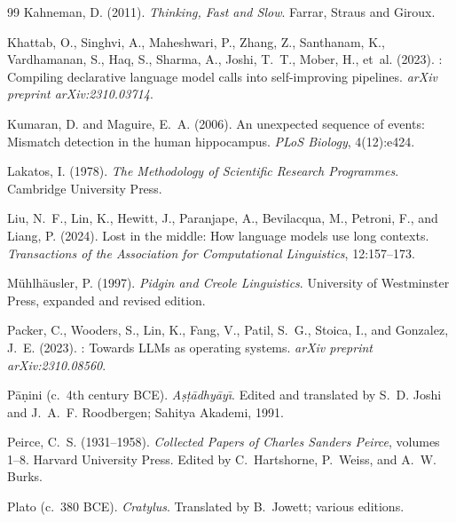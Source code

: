 \documentclass[11pt,a4paper]{article}
\begin{document}
\begin{thebibliography}{99}
Kahneman, D. (2011).
\newblock \emph{Thinking, Fast and Slow}.
\newblock Farrar, Straus and Giroux.

Khattab, O., Singhvi, A., Maheshwari, P., Zhang, Z., Santhanam, K., Vardhamanan, S., Haq, S., Sharma, A., Joshi, T.~T., Mober, H., et~al. (2023).
: Compiling declarative language model calls into self-improving pipelines.
\newblock \emph{arXiv preprint arXiv:2310.03714}.

Kumaran, D. and Maguire, E.~A. (2006).
\newblock An unexpected sequence of events: Mismatch detection in the human hippocampus.
\newblock \emph{PLoS Biology}, 4(12):e424.

Lakatos, I. (1978).
\newblock \emph{The Methodology of Scientific Research Programmes}.
\newblock Cambridge University Press.

Liu, N.~F., Lin, K., Hewitt, J., Paranjape, A., Bevilacqua, M., Petroni, F., and Liang, P. (2024).
\newblock Lost in the middle: How language models use long contexts.
\newblock \emph{Transactions of the Association for Computational Linguistics}, 12:157--173.

M\"uhlh\"ausler, P. (1997).
\newblock \emph{Pidgin and Creole Linguistics}.
\newblock University of Westminster Press, expanded and revised edition.

Packer, C., Wooders, S., Lin, K., Fang, V., Patil, S.~G., Stoica, I., and Gonzalez, J.~E. (2023).
: Towards {LLM}s as operating systems.
\newblock \emph{arXiv preprint arXiv:2310.08560}.

P\=a\d{n}ini (c.~4th century BCE).
\newblock \emph{A\d{s}\d{t}\=adhy\=ay\={\i}}.
\newblock Edited and translated by S.~D. Joshi and J.~A.~F. Roodbergen; Sahitya Akademi, 1991.

Peirce, C.~S. (1931--1958).
\newblock \emph{Collected Papers of Charles Sanders Peirce}, volumes 1--8.
\newblock Harvard University Press. Edited by C.~Hartshorne, P.~Weiss, and A.~W. Burks.

Plato (c.~380 BCE{}).
\newblock \emph{Cratylus}.
\newblock Translated by B.~Jowett; various editions.


\end{thebibliography}
\end{document}
